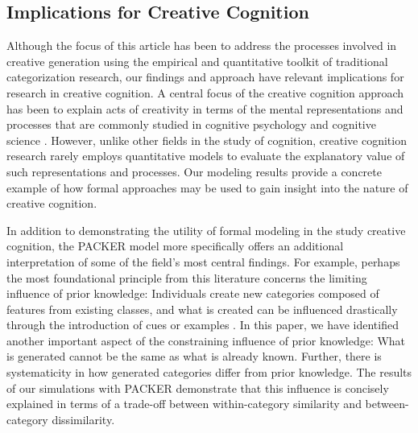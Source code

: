\documentclass[12pt]{article}
\begin{document}
\begin{flushleft}
\subsection{Implications for Creative Cognition}

Although the focus of this article has been to address the processes involved in creative generation using the empirical and quantitative toolkit of traditional categorization research, our findings and approach have relevant implications for research in creative cognition. A central focus of the creative cognition approach has been to explain acts of creativity in terms of the mental representations and processes that are commonly studied in cognitive psychology and cognitive science \citep{finke1992creative,smith1995creative}. However, unlike other fields in the study of cognition, creative cognition research rarely employs quantitative models to evaluate the explanatory value of such representations and processes. Our modeling results provide a concrete example of how formal approaches may be used to gain insight into the nature of creative cognition.

In addition to demonstrating the utility of formal modeling in the study creative cognition, the PACKER model more specifically offers an additional interpretation of some of the field's most central findings. For example, perhaps the most foundational principle from this literature concerns the limiting influence of prior knowledge: Individuals create new categories composed of features from existing classes, and what is created can be influenced drastically through the introduction of cues or examples \citep{marsh1999inadvertent,smith1993constraining}. In this paper, we have identified another important aspect of the constraining influence of prior knowledge: What is generated cannot be the same as what is already known. Further, there is systematicity in how generated categories differ from prior knowledge. The results of our simulations with PACKER demonstrate that this influence is concisely explained in terms of a trade-off between within-category similarity and between-category dissimilarity.


\end{flushleft}
\end{document}
